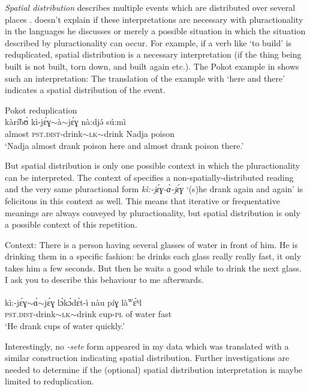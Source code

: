 \documentclass[output=paper,colorlinks,citecolor=brown
]{langscibook}
\begin{document}

\textit{Spatial distribution} describes multiple events which are distributed over several places \citep[24]{Mattiola2019}. \cite{Mattiola2019} doesn't explain if these interpretations are necessary with pluractionality in the languages he discusses or merely a possible situation in which the situation described by pluractionality can occur. For example, if a verb like `to build' is reduplicated, spatial distribution is a necessary interpretation (if the thing being built is not built, torn down, and built again etc.). The Pokot example in  shows such an interpretation: The translation of the example with `here and there' indicates a spatial distribution of the event.

\ea Pokot reduplication \label{ex:fiebig:spatz} \\
\gll kàríb̀ʊ̀ kì-jɛ́ɣ$\sim$à$\sim$jɛ́ɣ nà:djə́ sú:mì\\ 
almost \textsc{pst.dist}-drink$\sim$\textsc{lk}$\sim$drink Nadja poison\\
\glt `Nadja almost drank poison here and almost drank poison there.' 
\z 

\noindent But spatial distribution is only one possible context in which the pluractionality can be interpreted. The context of  specifies a non-spatially-distributed reading and the very same pluractional form \textit{kì:-jɛ́ɣ-ɑ̀-jɛ́ɣ} `(s)he drank again and again' is felicitous in this context as well. This means that iterative or frequentative meanings are always conveyed by pluractionality, but spatial distribution is only a possible context of this repetition. 

\ea \label{ex:fiebig:water-glass} Context: There is a person having several glasses of water in front of him. He is drinking them in a specific fashion: he drinks each glass really really fast, it only takes him a few seconds. But then he waits a good while to drink the next glass. I ask you to describe this behaviour to me afterwards.
\begin{xlist}
\ex \gll kì:-jɛ́ɣ$\sim$ɑ̀$\sim$jɛ́ɣ lɔ̀kɔ̀dɛ́t-ì nàu píɣ là\textsuperscript{w}ɛ́ʰl\\
\textsc{pst.dist}-drink$\sim$\textsc{lk}$\sim$drink cup-\textsc{pl} of water fast\\
\glt `He drank cups of water quickly.'
\end{xlist}
\z

\noindent Interestingly, no \textit{-sete} form appeared in my data which was translated with a similar construction indicating spatial distribution. Further investigations are needed to determine if the (optional) spatial distribution interpretation is maybe limited to reduplication.
\end{document}
